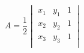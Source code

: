 \documentclass[12pt]{article}
\begin{document}
\[
    A = \frac{1}{2}\begin{vmatrix}
        x_1 & y_1 & 1 \\
        x_2 & y_2 & 1 \\
        x_3 & y_3 & 1 \\
    \end{vmatrix}
\]
\end{document}

